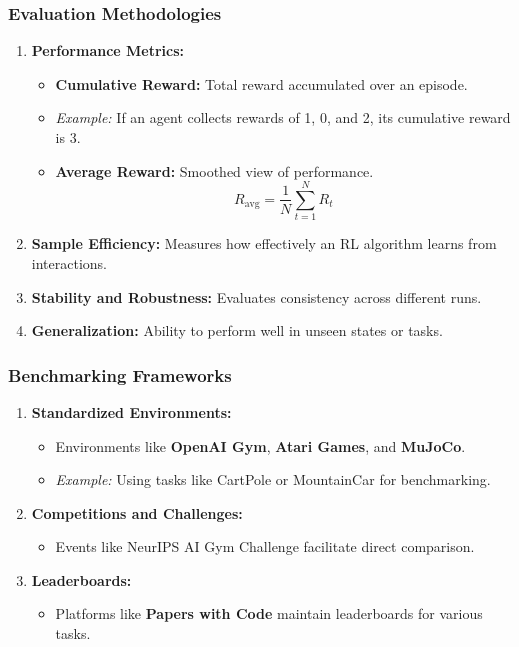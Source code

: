 \documentclass{beamer}
\begin{document}
\begin{frame}[fragile]
    \frametitle{Evaluation Methodologies}
    \begin{enumerate}
        \item \textbf{Performance Metrics:}
            \begin{itemize}
                \item \textbf{Cumulative Reward:} Total reward accumulated over an episode.
                \item \textit{Example:} If an agent collects rewards of 1, 0, and 2, its cumulative reward is 3.
                \item \textbf{Average Reward:} Smoothed view of performance.
                \begin{equation}
                    R_{\text{avg}} = \frac{1}{N} \sum_{t=1}^{N} R_t
                \end{equation}
            \end{itemize}

        \item \textbf{Sample Efficiency:} Measures how effectively an RL algorithm learns from interactions.

        \item \textbf{Stability and Robustness:} Evaluates consistency across different runs.

        \item \textbf{Generalization:} Ability to perform well in unseen states or tasks.
    \end{enumerate}
\end{frame}

\begin{frame}[fragile]
    \frametitle{Benchmarking Frameworks}
    \begin{enumerate}
        \item \textbf{Standardized Environments:}
            \begin{itemize}
                \item Environments like \textbf{OpenAI Gym}, \textbf{Atari Games}, and \textbf{MuJoCo}.
                \item \textit{Example:} Using tasks like CartPole or MountainCar for benchmarking.
            \end{itemize}

        \item \textbf{Competitions and Challenges:}
            \begin{itemize}
                \item Events like NeurIPS AI Gym Challenge facilitate direct comparison.
            \end{itemize}

        \item \textbf{Leaderboards:}
            \begin{itemize}
                \item Platforms like \textbf{Papers with Code} maintain leaderboards for various tasks.
            \end{itemize}
    \end{enumerate}
\end{frame}
\end{document}
